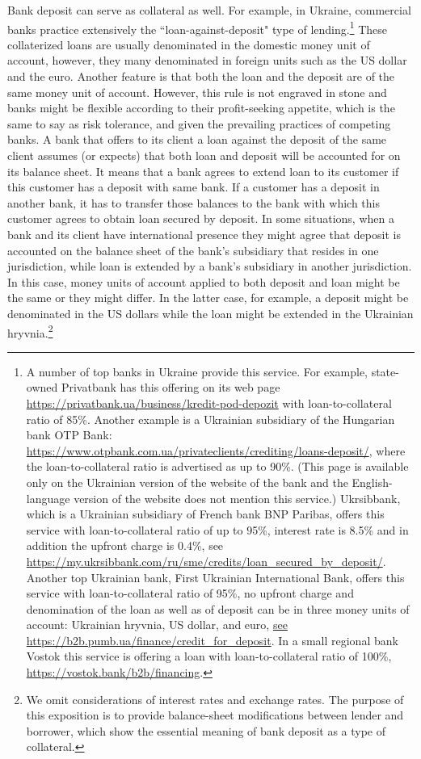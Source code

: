 Bank deposit can serve as collateral as well. For example, in Ukraine, commercial banks practice extensively the ``loan-against-deposit" type of lending.\footnote{A number of top banks in Ukraine provide this service. For example, state-owned Privatbank has this offering on its web page \url{https://privatbank.ua/business/kredit-pod-depozit} with loan-to-collateral ratio of 85\%. Another example is a Ukrainian subsidiary of the Hungarian bank OTP Bank: \url{https://www.otpbank.com.ua/privateclients/crediting/loans-deposit/}, where the loan-to-collateral ratio is advertised as up to 90\%. (This page is available only on the Ukrainian version of the website of the bank and the English-language version of the website does not mention this service.) Ukrsibbank, which is a Ukrainian subsidiary of French bank BNP Paribas, offers this service with loan-to-collateral ratio of up to 95\%, interest rate is 8.5\% and in addition the upfront charge is 0.4\%, see \url{https://my.ukrsibbank.com/ru/sme/credits/loan_secured_by_deposit/}. Another top Ukrainian bank, First Ukrainian International Bank, offers this service with loan-to-collateral ratio of 95\%, no upfront charge and denomination of the loan as well as of deposit can be in three money units of account: Ukrainian hryvnia, US dollar, and euro, \url{see https://b2b.pumb.ua/finance/credit_for_deposit}. In a small regional bank Vostok this service is offering a loan with loan-to-collateral ratio of 100\%, \url{https://vostok.bank/b2b/financing}.} These collaterized loans are usually denominated in the domestic money unit of account, however, they many denominated in foreign units such as the US dollar and the euro. Another feature is that both the loan and the deposit are of the same money unit of account. However, this rule is not engraved in stone and banks might be flexible according to their profit-seeking appetite, which is the same to say as risk tolerance, and given the prevailing practices of competing banks. A bank that offers to its client a loan against the deposit of the same client assumes (or expects) that both loan and deposit will be accounted for on its balance sheet. It means that a bank agrees to extend loan to its customer if this customer has a deposit with same bank. If a customer has a deposit in another bank, it has to transfer those balances to the bank with which this customer agrees to obtain loan secured by deposit. In some situations, when a bank and its client have international presence they might agree that deposit is accounted on the balance sheet of the bank's subsidiary that resides in one jurisdiction, while loan is extended by a bank's subsidiary in another jurisdiction. In this case, money units of account applied to both deposit and loan might be the same or they might differ. In the latter case, for example, a deposit might be denominated in the US dollars while the loan might be extended in the Ukrainian hryvnia.\footnote{We omit considerations of interest rates and exchange rates. The purpose of this exposition is to provide balance-sheet modifications between lender and borrower, which show the essential meaning of bank deposit as a type of collateral.} 


